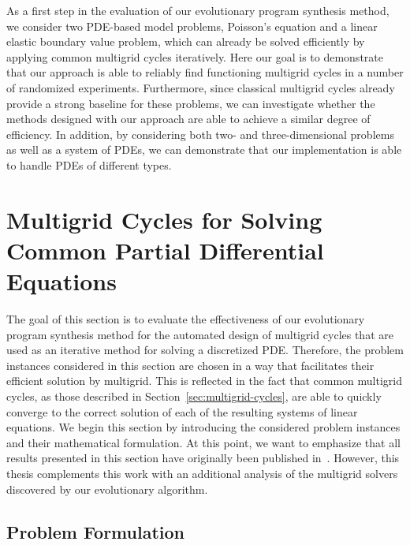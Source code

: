 As a first step in the evaluation of our evolutionary program synthesis method, we consider two PDE-based model problems, Poisson's equation and a linear elastic boundary value problem, which can already be solved efficiently by applying common multigrid cycles iteratively.
Here our goal is to demonstrate that our approach is able to reliably find functioning multigrid cycles in a number of randomized experiments.
Furthermore, since classical multigrid cycles already provide a strong baseline for these problems, we can investigate whether the methods designed with our approach are able to achieve a similar degree of efficiency.
In addition, by considering both two- and three-dimensional problems as well as a system of PDEs, we can demonstrate that our implementation is able to handle PDEs of different types.
\section{Multigrid Cycles for Solving Common Partial Differential Equations}
\label{sec:experiments-part1}
The goal of this section is to evaluate the effectiveness of our evolutionary program synthesis method for the automated design of multigrid cycles that are used as an iterative method for solving a discretized PDE.
Therefore, the problem instances considered in this section are chosen in a way that facilitates their efficient solution by multigrid.
This is reflected in the fact that common multigrid cycles, as those described in Section~\ref{sec:multigrid-cycles}, are able to quickly converge to the correct solution of each of the resulting systems of linear equations.
We begin this section by introducing the considered problem instances and their mathematical formulation.
At this point, we want to emphasize that all results presented in this section have originally been published in~\cite{schmitt2021evostencils}.
However, this thesis complements this work with an additional analysis of the multigrid solvers discovered by our evolutionary algorithm.
\subsection{Problem Formulation}
